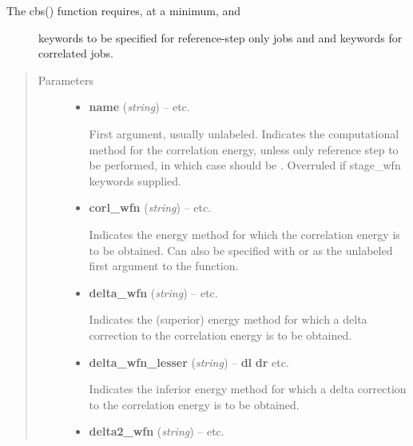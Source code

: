 \documentclass[letterpaper,10pt,english]{sphinxmanual}
\begin{document}
\begin{fulllineitems}
\begin{itemize}
\begin{description}
\end{description}

\end{itemize}
\begin{description}
\item[{The cbs() function requires, at a minimum,  and }] \leavevmode
keywords to be specified for reference-step only jobs and  and
 keywords for correlated jobs.

\end{description}
\begin{quote}\begin{description}
\item[{Parameters}] \leavevmode\begin{itemize}
\item {} 
\textbf{name} (\emph{string}) -- 
 \textbar{}\textbar{}  \textbar{}\textbar{} etc.

First argument, usually unlabeled. Indicates the computational method
for the correlation energy, unless only reference step to be performed,
in which case should be . Overruled if stage\_wfn keywords supplied.


\item {} 
\textbf{corl\_wfn} (\emph{string}) -- 
 \textbar{}\textbar{}  \textbar{}\textbar{} etc.

Indicates the energy method for which the correlation energy is to be
obtained. Can also be specified with  or as the unlabeled
first argument to the function.


\item {} 
\textbf{delta\_wfn} (\emph{string}) -- 
 \textbar{}\textbar{}  \textbar{}\textbar{} etc.

Indicates the (superior) energy method for which a delta correction
to the correlation energy is to be obtained.


\item {} 
\textbf{delta\_wfn\_lesser} (\emph{string}) -- 
{\color{red}\bfseries{}\textbar{}dl\textbar{}}  {\color{red}\bfseries{}\textbar{}dr\textbar{}} \textbar{}\textbar{}  \textbar{}\textbar{} etc.

Indicates the inferior energy method for which a delta correction
to the correlation energy is to be obtained.


\item {} 
\textbf{delta2\_wfn} (\emph{string}) -- 
 \textbar{}\textbar{}  \textbar{}\textbar{} etc.


\end{itemize}
\end{description}
\end{quote}
\end{fulllineitems}
\end{document}
